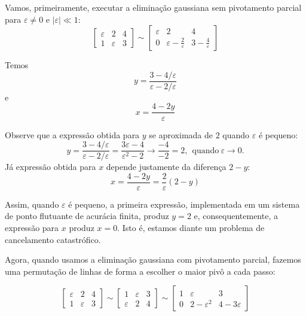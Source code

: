 \begin{sol}
Vamos, primeiramente, executar a eliminação gaussiana sem pivotamento parcial para $\varepsilon \neq 0$ e $|\varepsilon|\ll 1$:
$$\left[\begin{array}{cc|c}
\varepsilon & 2 & 4\\
1 & \varepsilon & 3
\end{array}
\right]\sim\left[\begin{array}{cc|c}
\varepsilon & 2 & 4\\
0 & \varepsilon-\frac{2}{\varepsilon} & 3-\frac{4}{\varepsilon}
\end{array}
\right]
$$

Temos
$$y=\frac{3-4/\varepsilon}{\varepsilon-2/\varepsilon}$$%
e
$$x=\frac{4-2y}{\varepsilon}$$ %

Observe que a expressão obtida para  $y$ se aproximada de $2$ quando $\varepsilon$ é pequeno:
$$y=\frac{3-4/\varepsilon}{\varepsilon-2/\varepsilon}=\frac{3\varepsilon-4}{\varepsilon^2-2} \longrightarrow \frac{-4}{-2}=2, ~~\text{quando}~\varepsilon \to 0.$$
Já expressão obtida para $x$ depende justamente da diferença $2-y$:
$$x=\frac{4-2y}{\varepsilon}=\frac{2}{\varepsilon} (2-y)$$

Assim, quando $\varepsilon$ é pequeno, a primeira expressão, implementada em um sistema de ponto flutuante de acurácia finita, produz $y= 2$ e, consequentemente, a expressão para $x$ produz $x=0$. Isto é, estamos diante um problema de cancelamento catastrófico.

Agora, quando usamos a eliminação gaussiana com pivotamento parcial, fazemos uma permutação de linhas de forma a escolher o maior pivô a cada passo:

$$\left[\begin{array}{cc|c}
\varepsilon & 2 & 4\\
1 & \varepsilon & 3
\end{array}
\right]\sim
\left[\begin{array}{cc|c}
1 & \varepsilon & 3\\
\varepsilon & 2 & 4
\end{array}
\right]\sim
\left[\begin{array}{cc|c}
1 & \varepsilon & 3\\
0 & 2-\varepsilon^2 & 4-3\varepsilon
\end{array}
\right]
$$


\end{sol}
